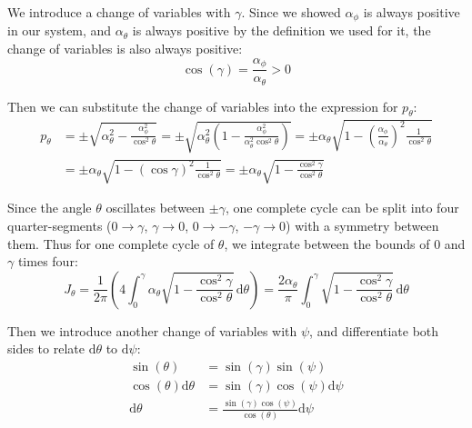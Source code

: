 \documentclass[titlepage]{article}
\begin{document}
We introduce a change of variables with $\gamma$. Since we showed $\alpha_\phi$ is always positive in our system, and $\alpha_\theta$ is always positive by the definition we used for it, the change of variables is also always positive:
\begin{equation}
	\cos(\gamma)=\frac{\alpha_\phi}{\alpha_\theta}>0
\end{equation}

Then we can substitute the change of variables into the expression for $p_\theta$:
\begin{equation}
	\begin{split}
		p_\theta&=\pm\sqrt{\alpha_\theta^2-\frac{\alpha_\phi^2}{\cos^2\theta}}=\pm\sqrt{\alpha_\theta^2\left(1-\frac{\alpha_\phi^2}{\alpha_\theta^2\cos^2\theta}\right)}=\pm\alpha_\theta\sqrt{1-\left(\frac{\alpha_\phi}{\alpha_\theta}\right)^2\frac{1}{\cos^2\theta}} \\
		&=\pm\alpha_\theta\sqrt{1-\left(\cos\gamma\right)^2\frac{1}{\cos^2\theta}}=\pm\alpha_\theta\sqrt{1-\frac{\cos^2\gamma}{\cos^2\theta}}
	\end{split}
\end{equation}

Since the angle $\theta$ oscillates between $\pm\gamma$, one complete cycle can be split into four quarter-segments ($0\to\gamma$, $\gamma\to0$, $0\to-\gamma$, $-\gamma\to0$) with a symmetry between them. Thus for one complete cycle of $\theta$, we integrate between the bounds of $0$ and $\gamma$ times four:
\begin{equation}
	J_\theta=\frac{1}{2\pi}\left(4\int_{0}^{\gamma}\alpha_\theta\sqrt{1-\frac{\cos^2\gamma}{\cos^2\theta}}\,\mathrm{d}\theta\right)=\frac{2\alpha_\theta}{\pi}\int_{0}^{\gamma}\sqrt{1-\frac{\cos^2\gamma}{\cos^2\theta}}\,\mathrm{d}\theta
\end{equation}

Then we introduce another change of variables with $\psi$, and differentiate both sides to relate $\mathrm{d}\theta$ to $\mathrm{d}\psi$:
\begin{equation}
	\begin{split}
		\sin(\theta)&=\sin(\gamma)\sin(\psi) \\
		\cos(\theta)\mathrm{d}\theta&=\sin(\gamma)\cos(\psi)\mathrm{d}\psi \\
		\mathrm{d}\theta&=\frac{\sin(\gamma)\cos(\psi)}{\cos(\theta)}\mathrm{d}\psi
	\end{split}
\end{equation}
\end{document}
